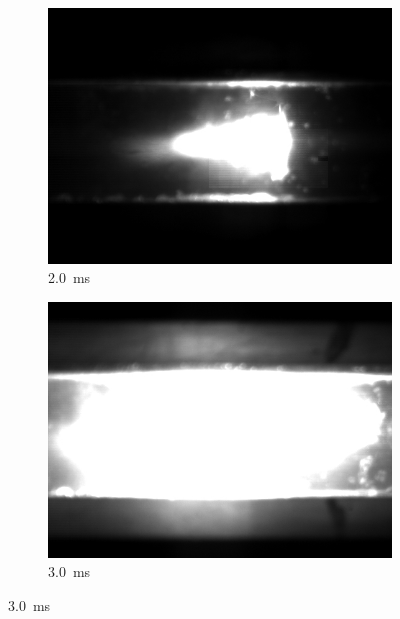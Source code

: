         \begin{figure}[h]
            \centering
            \begin{subfigure}[t]{0.32\textwidth}
                \centering
                \includegraphics[width=\textwidth]{assets/3 design/LSP1_frames/20.jpg}
                \caption{2.0~ms}
                \label{fig:lsp1_20}
            \end{subfigure}
            \hfill
            \begin{subfigure}[t]{0.32\textwidth}
                \centering
                \includegraphics[width=\textwidth]{assets/3 design/LSP1_frames/30.jpg}
                \caption{3.0~ms}
                \label{fig:lsp1_30}
            \end{subfigure}

\end{figure}

